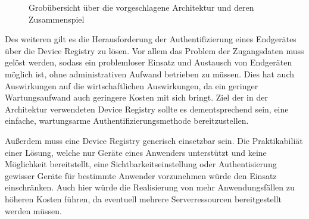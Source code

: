 \begin{figure}
    \centering
    \caption{Grobübersicht über die vorgeschlagene Architektur und deren Zusammenspiel}
    \label{fig:high_level}
\end{figure}

Des weiteren gilt es die Herausforderung der Authentifizierung eines Endgerätes über die Device Registry zu lösen. Vor allem das Problem der Zugangsdaten muss gelöst werden, sodass ein problemloser Einsatz und Austausch von Endgeräten möglich ist, ohne administrativen Aufwand betrieben zu müssen. Dies hat auch Auswirkungen auf die wirtschaftlichen Auswirkungen, da ein geringer Wartungsaufwand auch geringere Kosten mit sich bringt. Ziel der in der Architektur verwendeten Device Registry sollte es dementsprechend sein, eine einfache, wartungsarme Authentifizierungsmethode bereitzustellen.

Außerdem muss eine Device Registry generisch einsetzbar sein. Die Praktikabiliät einer Lösung, welche nur Geräte eines Anwenders unterstützt und keine Möglichkeit bereitstellt, eine Sichtbarkeitseinstellung oder Authentisierung gewisser Geräte für bestimmte Anwender vorzunehmen würde den Einsatz einschränken. Auch hier würde die Realisierung von mehr Anwendungsfällen zu höheren Kosten führen, da eventuell mehrere Serverressourcen bereitgestellt werden müssen.



